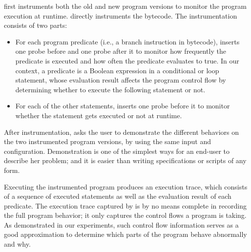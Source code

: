 \ourtool first instruments both the old and new program versions
to monitor the program  execution at runtime. \ourtool directly
instruments the bytecode. The instrumentation
consists of two parts:

\vspace{-2mm}

\begin{itemize}
\item For each program predicate (i.e., a branch instruction
in bytecode), \ourtool inserts one
probe before and one probe after it
to monitor how frequently the predicate is executed and
how often the predicate evaluates to true. In our
context, a predicate is a Boolean expression in a
conditional or loop statement,
whose evaluation result affects the program
control flow by determining whether to execute the
following statement or not.


\item For each of the other statements, \ourtool inserts
one probe before it to monitor whether the statement
gets executed or not at runtime.



\end{itemize}


\vspace{-1mm}

After instrumentation, \ourtool asks the user to demonstrate the different
behaviors on the two instrumented program versions, by using
the same input and configuration. Demonstration is
one of the simplest ways for an end-user to describe her problem;
and it is easier than writing specifications or scripts of any form.

Executing the instrumented program produces an execution trace,
which consists of a sequence of executed statements as well
as the evaluation result of each predicate.
The execution trace captured by \ourtool is by no means complete
in recording the full program behavior; it only
captures the control flows a program is taking. As demonstrated
in our experiments, such control flow information serves as a
good approximation to determine which parts of the program behave
abnormally and why.





